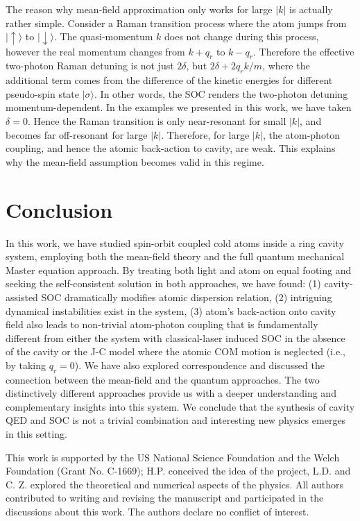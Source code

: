 \documentclass[atoms,article,submit,moreauthors,pdftex,12pt,a4paper]{mdpi}
\begin{document}
The reason why mean-field approximation only works for large $|k|$ is actually rather simple. Consider a Raman transition process where the atom jumps from $|\uparrow \rangle$ to $|\downarrow \rangle$. The quasi-momentum $k$ does not change during this process, however the real momentum changes from $k+q_r$ to $k-q_r$. Therefore the effective two-photon Raman detuning is not just $2\delta$, but $2\delta +2q_rk/m$, where the additional term comes from the difference of the kinetic energies for different pseudo-spin state $|\sigma\rangle$. In other words, the SOC renders the two-photon detuning momentum-dependent. In the examples we presented in this work, we have taken $\delta=0$. Hence the Raman transition is only near-resonant for small $|k|$, and becomes far off-resonant for large $|k|$. Therefore, for large $|k|$, the atom-photon coupling, and hence the atomic back-action to cavity, are weak. This explains why the mean-field assumption becomes valid in this regime.   


\section{Conclusion} \label{conclusion}

In this work, we have studied spin-orbit coupled cold atoms inside a ring cavity system, employing both the mean-field theory and the full quantum mechanical Master equation approach. By treating both light and atom on equal footing and seeking the self-consistent solution in both approaches, we have found: (1) cavity-assisted SOC dramatically modifies atomic dispersion relation, (2) intriguing dynamical instabilities exist in the system, (3) atom's back-action onto cavity field also leads to non-trivial atom-photon coupling that is fundamentally different from either the system with classical-laser induced SOC in the absence of the cavity or the J-C model where the atomic COM motion is neglected (i.e., by taking $q_r=0$). We have also explored correspondence and discussed the connection between the mean-field and the quantum approaches. The two distinctively different approaches provide us with a deeper understanding and complementary insights into this system. We conclude that the synthesis of cavity QED and SOC is not a trivial combination and interesting new physics emerges in this setting.



This work is supported by the US National Science Foundation and the Welch Foundation (Grant No. C-1669);
H.P. conceived the idea of the project, L.D. and C. Z. explored the theoretical and numerical aspects of the physics. All authors contributed to writing and revising the manuscript and participated in the discussions about this work.
The authors declare no conflict of interest. 
\end{document}
